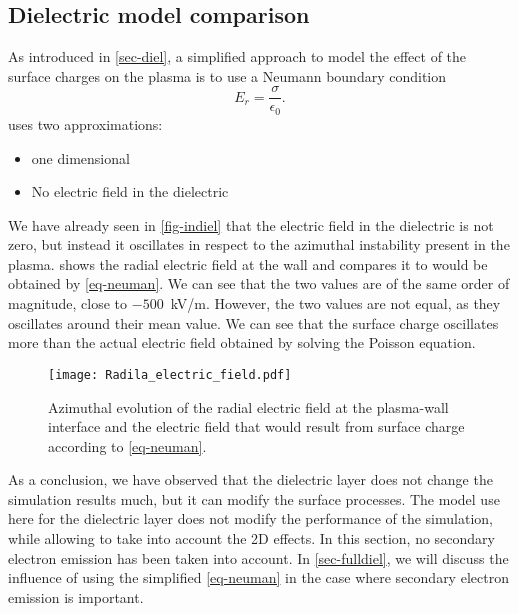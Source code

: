     
  \subsection{Dielectric model comparison} \label{subsec-modelcomp}

  
  As introduced in \cref{sec-diel}, a simplified approach to model the effect of the surface charges on the plasma is to use a Neumann boundary condition \citep{taccogna2019}
  \begin{equation} \label{eq-neuman}
    E_r = \frac{\sigma}{\epsilon_0}.
  \end{equation}
   uses two approximations\string:
  \begin{itemize}
    \item one dimensional
    \item No electric field in the dielectric
  \end{itemize}
  We have already seen in \cref{fig-indiel} that the electric field in the dielectric is not zero, but instead it oscillates in respect to the azimuthal instability present in the plasma.  
   shows the radial electric field at the wall and compares it to would be obtained by \cref{eq-neuman}.
  We can see that the two values are of the same order of magnitude, close to $-500$~kV/m.
  However, the two values are not equal, as they oscillates around their mean value.
  We can see that the surface charge oscillates more than the actual electric field obtained by solving the Poisson equation.

\begin{figure}[hbt]
  \centering
  \texttt{[image: Radila\_electric\_field.pdf]}
  \caption{Azimuthal evolution of the radial electric field at the plasma-wall interface and the electric field that would result from surface charge according to \cref{eq-neuman}.}
  \label{fig-spacial_comparaison}
\end{figure}
\renewcommand\subfigurewidth{0.45\textwidth}

  As a conclusion, we have observed that the dielectric layer does not change the simulation results much, but it can modify the surface processes.
  The model use here for the dielectric layer does not modify the performance of the simulation, while allowing to take into account the \ac{2D} effects.
  In this section, no secondary electron emission has been taken into account.
  In \cref{sec-fulldiel}, we will discuss the influence of using the simplified \cref{eq-neuman} in the case where secondary electron emission is important.

  